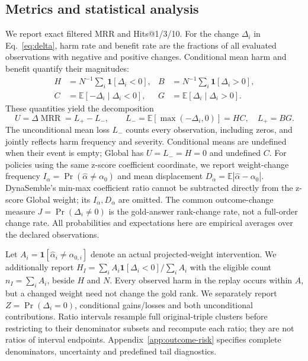 \documentclass[11pt,a4paper]{article}
\newcommand{\MRR}{\operatorname{MRR}}
\newcommand{\ind}{\mathbf{1}}
\newcommand{\E}{\mathbb{E}}
\begin{document}
\subsection{Metrics and statistical analysis}
We report exact filtered MRR and Hits@1/3/10. For the change $\Delta_i$ in Eq.~\eqref{eq:delta}, harm rate and benefit rate are the fractions of all evaluated observations with negative and positive changes. Conditional mean harm and benefit quantify their magnitudes:
\begin{align}
H&=N^{-1}\sum_i\ind[\Delta_i<0], & B&=N^{-1}\sum_i\ind[\Delta_i>0],\\
C&=\E[-\Delta_i\mid\Delta_i<0], & G&=\E[\Delta_i\mid\Delta_i>0].
\end{align}
These quantities yield the decomposition
\begin{equation}
U=\Delta\MRR=L_+-L_-,\qquad L_-=\E[\max(-\Delta_i,0)]=H C,\quad L_+=B G.
\label{eq:utility-harm}
\end{equation}
The unconditional mean loss $L_-$ counts every observation, including zeros, and jointly reflects harm frequency and severity. Conditional means are undefined when their event is empty; Global has $U=L_-=H=0$ and undefined $C$. For policies using the same z-score coefficient coordinate, we report weight-change frequency $I_\alpha=\Pr(\widehat\alpha\ne\alpha_0)$ and mean displacement $D_\alpha=\E|\widehat\alpha-\alpha_0|$. DynaSemble's min-max coefficient ratio cannot be subtracted directly from the z-score Global weight; its $I_\alpha,D_\alpha$ are omitted. The common outcome-change measure $J=\Pr(\Delta_i\ne0)$ is the gold-answer rank-change rate, not a full-order change rate. All probabilities and expectations here are empirical averages over the declared observations.

Let $A_i=\ind[\widehat\alpha_i\ne\alpha_{0,i}]$ denote an actual projected-weight intervention. We additionally report $H_I=\sum_i A_i\ind[\Delta_i<0]/\sum_i A_i$ with the eligible count $n_I=\sum_i A_i$, beside $H$ and $N$. Every observed harm in the replay occurs within $A$, but a changed weight need not change the gold rank. We separately report $Z=\Pr(\Delta_i=0)$, conditional gains/losses and both unconditional contributions. Ratio intervals resample full original-triple clusters before restricting to their denominator subsets and recompute each ratio; they are not ratios of interval endpoints. Appendix~\ref{app:outcome-risk} specifies complete denominators, uncertainty and predefined tail diagnostics.
\end{document}

